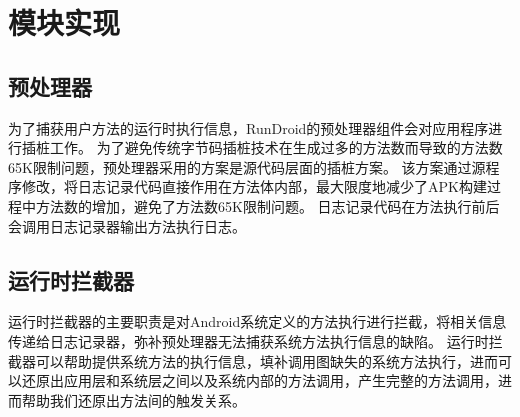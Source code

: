 \section{模块实现}


\subsection{预处理器}

为了捕获用户方法的运行时执行信息，RunDroid的预处理器组件会对应用程序进行插桩工作。
为了避免传统字节码插桩技术在生成过多的方法数而导致的方法数65K限制问题，预处理器采用的方案是源代码层面的插桩方案。
该方案通过源程序修改，将日志记录代码直接作用在方法体内部，最大限度地减少了APK构建过程中方法数的增加，避免了方法数65K限制问题。
日志记录代码在方法执行前后会调用日志记录器输出方法执行日志。




\subsection{运行时拦截器}
运行时拦截器的主要职责是对Android系统定义的方法执行进行拦截，将相关信息传递给日志记录器，弥补预处理器无法捕获系统方法执行信息的缺陷。
运行时拦截器可以帮助提供系统方法的执行信息，填补调用图缺失的系统方法执行，进而可以还原出应用层和系统层之间以及系统内部的方法调用，产生完整的方法调用，进而帮助我们还原出方法间的触发关系。


